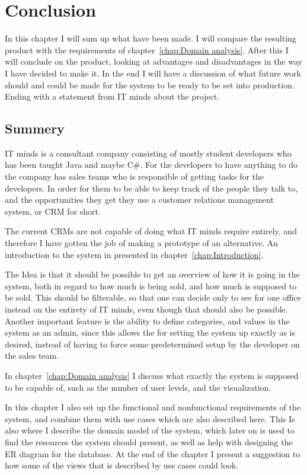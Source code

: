 \chapter{Conclusion}
\label{chap:Conclusion}
In this chapter I will sum up what have been made. I will compare the resulting
product with the requirements of chapter~\ref{chap:Domain analysis}. After this
I will conclude on the product, looking at advantages and disadvantages in the
way I have decided to make it.
In the end I will have a discussion of what future work should and could be made
for the system to be ready to be set into production. Ending with a statement
from IT minds about the project.

\section{Summery}
IT minds is a consultant company consisting of mostly student developers who has
been taught Java and maybe C\#. For the developers to have anything to do the
company has sales teams who is responsible of getting tasks for the developers.
In order for them to be able to keep track of the people they talk to, and the
opportunities they get they use a customer relations management system, or CRM
for short. 

The current CRMs are not capable of doing what IT minds require entirely, and
therefore I have gotten the job of making a prototype of an alternative. An
introduction to the system in presented in chapter~\ref{chap:Introduction}.

The Idea is that it should be possible to get an overview of how it is going in
the system, both in regard to how much is being sold, and how much is supposed
to be sold. This should be filterable, so that one can decide only to see for
one office instead on the entirety of IT minds, even though that should also be
possible. Another important feature is the ability to define categories, and
values in the system as an admin, since this allows the for setting the system
up exactly as is desired, instead of having to force some predetermined setup by
the developer on the sales team.

In chapter~\ref{chap:Domain analysis} I discuss what exactly the system is
supposed to be capable of, such as the number of user levels, and the
visualization.

In this chapter I also set up the functional and nonfunctional requirements of
the system, and combine them with use cases which are also described here. This
Is also where I describe the domain model of the system, which later on is used
to find the resources the system should present, as well as help with designing
the ER diagram for the database. At the end of the chapter I present a suggestion
to how some of the views that is described by use cases could look.

